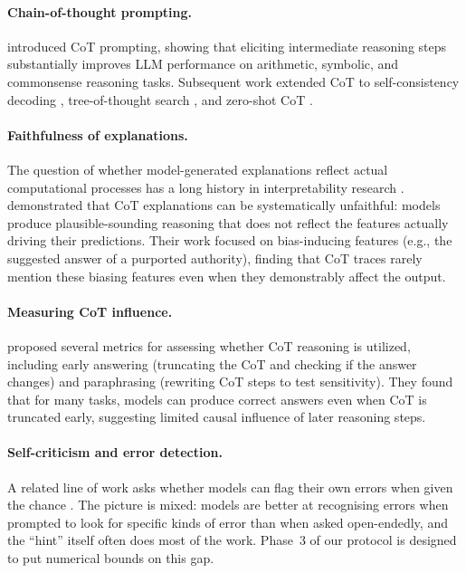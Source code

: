 \documentclass{article}
\begin{document}
\paragraph{Chain-of-thought prompting.} \citet{wei2022chain} introduced CoT prompting, showing that eliciting intermediate reasoning steps substantially improves LLM performance on arithmetic, symbolic, and commonsense reasoning tasks. Subsequent work extended CoT to self-consistency decoding \citep{wang2023selfconsistency}, tree-of-thought search \citep{yao2023tree}, and zero-shot CoT \citep{kojima2022large}.

\paragraph{Faithfulness of explanations.} The question of whether model-generated explanations reflect actual computational processes has a long history in interpretability research \citep{jacovi2020towards}. \citet{turpin2023language} demonstrated that CoT explanations can be systematically unfaithful: models produce plausible-sounding reasoning that does not reflect the features actually driving their predictions. Their work focused on bias-inducing features (e.g., the suggested answer of a purported authority), finding that CoT traces rarely mention these biasing features even when they demonstrably affect the output.

\paragraph{Measuring CoT influence.} \citet{lanham2023measuring} proposed several metrics for assessing whether CoT reasoning is utilized, including early answering (truncating the CoT and checking if the answer changes) and paraphrasing (rewriting CoT steps to test sensitivity). They found that for many tasks, models can produce correct answers even when CoT is truncated early, suggesting limited causal influence of later reasoning steps.

\paragraph{Self-criticism and error detection.} A related line of work asks whether models can flag their own errors when given the chance \citep{huang2023large,kadavath2022language,saunders2022self}. The picture is mixed: models are better at recognising errors when prompted to look for specific kinds of error than when asked open-endedly, and the ``hint'' itself often does most of the work. Phase~3 of our protocol is designed to put numerical bounds on this gap.
\end{document}
